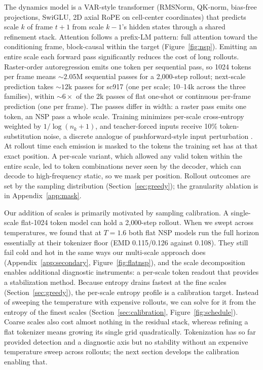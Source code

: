 \documentclass{article}
\begin{document}
The dynamics model is a VAR-style transformer (RMSNorm, QK-norm, bias-free projections,
SwiGLU, 2D axial RoPE on cell-center coordinates) that predicts scale $k$ of frame $t{+}1$
from scale $k{-}1$'s hidden states through a shared refinement stack. Attention follows a
prefix-LM pattern: full attention toward the conditioning frame, block-causal within the
target (Figure~\ref{fig:nsp}).
Emitting an entire scale each forward pass significantly reduces the cost of long
rollouts. Raster-order autoregression emits one token per sequential pass, so 1024 tokens per frame
means ${\sim}2.05$M sequential passes for a 2{,}000-step rollout; next-scale prediction
takes ${\sim}12$k passes for sc917 (one per scale; 10--14k across the three families),
within ${\sim}6{\times}$ of the $2$k passes of flat one-shot or continuous per-frame
prediction (one per frame). The passes differ in width: a raster pass emits one token, an
NSP pass a whole scale.
Training minimizes per-scale cross-entropy weighted by $1/\log(n_k{+}1)$, and
teacher-forced inputs receive 10\% token-substitution noise, a discrete analogue of
pushforward-style input perturbation \citep{brandstetter2022mppde,stachenfeld2022learned}.
At rollout time each emission is masked to the tokens the training set has at
that exact position. A per-scale variant, which allowed any valid token within the entire scale, led to token combinations never seen by the decoder, which can decode to high-frequency static, so we mask per position. Rollout outcomes are set by the sampling distribution
(Section~\ref{sec:greedy}); the granularity ablation is in Appendix~\ref{app:mask}.

Our addition of scales is primarily motivated by sampling calibration. A single-scale flat-1024 token model can hold a 2{,}000-step rollout. When we swept across temperatures, we found that at $T{=}1.6$ both flat NSP models run the full horizon essentially at their tokenizer floor (EMD 0.115/0.126 against
0.108). They still fail cold and hot in the same ways our multi-scale approach does
(Appendix~\ref{app:secondary}, Figure~\ref{fig:flatnsp}), and the scale decomposition enables additional diagnostic instruments: a per-scale token readout that provides a stabilization
method. Because entropy drains fastest at the fine scales (Section~\ref{sec:greedy}), the
per-scale entropy profile is a calibration target. Instead of sweeping the temperature
with expensive rollouts, we can solve for it from the entropy of the finest scales (Section~\ref{sec:calibration},
Figure~\ref{fig:schedule}). Coarse scales also cost almost nothing in the residual stack,
whereas refining a flat tokenizer means growing its single grid quadratically.
Tokenization has so far provided detection and a diagnostic axis but no stability without an expensive temperature sweep across rollouts; the
next section develops the calibration enabling that.
\end{document}
